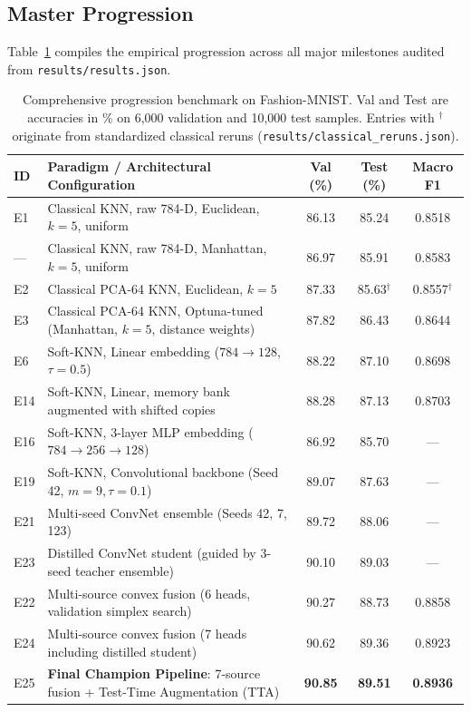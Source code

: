 \documentclass[10pt,a4paper]{article}
\newcommand{\file}[1]{\nolinkurl{#1}}
\begin{document}
\subsection{Master Progression}\label{sec:main}
Table~\ref{tab:main} compiles the empirical progression across all major milestones audited from \file{results/results.json}.

\begin{table}[!htb]
\centering\footnotesize
\caption{Comprehensive progression benchmark on Fashion-MNIST. Val and Test are accuracies in \% on 6{,}000 validation and 10{,}000 test samples. Entries with $^\dagger$ originate from standardized classical reruns (\file{results/classical_reruns.json}).}
\label{tab:main}
\begin{tabular}{@{}l>{\raggedright\arraybackslash}p{}ccc@{}}
\toprule
ID & Paradigm / Architectural Configuration & Val (\%) & Test (\%) & Macro F1 \\
\midrule
E1  & Classical KNN, raw 784-D, Euclidean, $k=5$, uniform & 86.13 & 85.24 & 0.8518 \\
--- & Classical KNN, raw 784-D, Manhattan, $k=5$, uniform & 86.97 & 85.91 & 0.8583 \\
E2  & Classical PCA-64 KNN, Euclidean, $k=5$ & 87.33 & 85.63$^\dagger$ & 0.8557$^\dagger$ \\
E3  & Classical PCA-64 KNN, Optuna-tuned (Manhattan, $k=5$, distance weights) & 87.82 & 86.43 & 0.8644 \\
\midrule
E6  & Soft-KNN, Linear embedding ($784\to128$, $\tau=0.5$) & 88.22 & 87.10 & 0.8698 \\
E14 & Soft-KNN, Linear, memory bank augmented with shifted copies & 88.28 & 87.13 & 0.8703 \\
E16 & Soft-KNN, 3-layer MLP embedding ($784\to256\to128$) & 86.92 & 85.70 & --- \\
\midrule
E19 & Soft-KNN, Convolutional backbone (Seed 42, $m=9, \tau=0.1$) & 89.07 & 87.63 & --- \\
E21 & Multi-seed ConvNet ensemble (Seeds 42, 7, 123) & 89.72 & 88.06 & --- \\
E23 & Distilled ConvNet student (guided by 3-seed teacher ensemble) & 90.10 & 89.03 & --- \\
\midrule
E22 & Multi-source convex fusion (6 heads, validation simplex search) & 90.27 & 88.73 & 0.8858 \\
E24 & Multi-source convex fusion (7 heads including distilled student) & 90.62 & 89.36 & 0.8923 \\
E25 & \textbf{Final Champion Pipeline}: 7-source fusion + Test-Time Augmentation (TTA) & \textbf{90.85} & \textbf{89.51} & \textbf{0.8936} \\
\bottomrule
\end{tabular}
\end{table}
\end{document}
